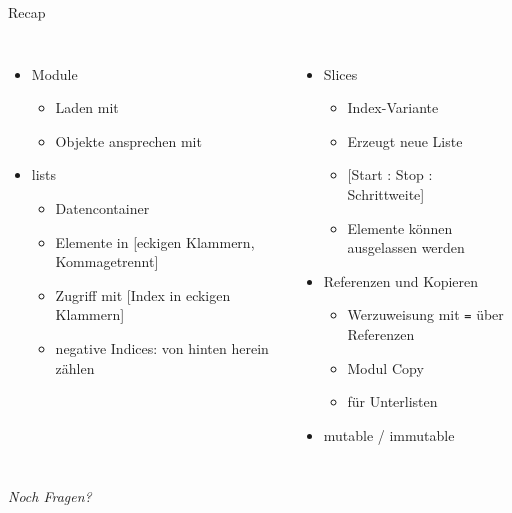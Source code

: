 
\begin{frame}[t,plain]
\titlepage
\end{frame}


\begin{frame}{Recap}
%
\begin{columns}[T]
\begin{itemize}
\item Module
	\begin{itemize}
	\item Laden mit 
	\item Objekte ansprechen mit 
	\end{itemize}
\item lists
	\begin{itemize}
	\item Datencontainer
	\item Elemente in [eckigen Klammern, Kommagetrennt]
	\item Zugriff mit [Index in eckigen Klammern]
	\item negative Indices: von hinten herein zählen
	\end{itemize}
\end{itemize}
%
\begin{itemize}
\item Slices
	\begin{itemize}
	\item Index-Variante
	\item Erzeugt neue Liste
	\item \phantom{x} [Start : Stop : Schrittweite]
	\item Elemente können ausgelassen werden
	\end{itemize}
\item Referenzen und Kopieren
	\begin{itemize}
	\item Werzuweisung mit \texttt{=} über Referenzen
	\item Modul Copy
	\item {} für Unterlisten
	\end{itemize}
\item mutable / immutable
\end{itemize}

\end{columns}
%
\begin{center}
	\emph{Noch Fragen?}
\end{center}
%
\end{frame}

